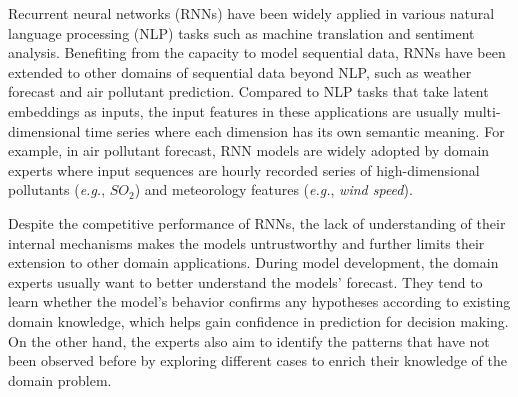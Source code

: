 \label{section:introduction}
Recurrent neural networks (RNNs) have been widely applied in various natural language processing (NLP) tasks such as machine translation and sentiment analysis. 
Benefiting from the capacity to model sequential data, RNNs have been extended to other domains of sequential data beyond NLP, such as weather forecast\cite{xingjian2015convolutional, cao2012forecasting, shi2017deep} and air pollutant prediction\cite{oprea2016neural, zhou2017prediction, li2017long}. 
Compared to NLP tasks that take latent embeddings as inputs, the input features in these applications are usually multi-dimensional time series where each dimension has its own semantic meaning.
For example, in air pollutant forecast, RNN models are widely adopted by domain experts where input sequences are hourly recorded series of high-dimensional pollutants (\emph{e.g.}, $SO_{2}$) and meteorology features (\emph{e.g.}, \textit{wind speed}).

Despite the competitive performance of RNNs, the lack of understanding of their internal mechanisms makes the models untrustworthy and further limits their extension to other domain applications. 
During model development, the domain experts usually want to better understand the models' forecast.
They tend to learn whether the model's behavior confirms any hypotheses according to existing domain knowledge, which helps gain confidence in prediction for decision making.
On the other hand, the experts also aim to identify the patterns that have not been observed before by exploring different cases to enrich their knowledge of the domain problem.

